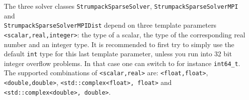 \documentclass{article}
\begin{document}
The three solver classes \lstinline[style=C]!StrumpackSparseSolver!,
\lstinline[style=C]!StrumpackSparseSolverMPI! and\\
\lstinline[style=C]!StrumpackSparseSolverMPIDist! depend on three
template parameters \lstinline[style=C]!<scalar,real,integer>!: the
type of a scalar, the type of the corresponding real number and an
integer type. It is recommended to first try to simply use the default
\lstinline[style=C]!int! type for this last template parameter, unless
you run into 32 bit integer overflow problems. In that case one can
switch to for instance \lstinline[style=C]!int64_t!. The supported
combinations of \lstinline[style=C]!<scalar,real>! are:
\lstinline[style=C]!<float,float>!,
\lstinline[style=C]!<double,double>!,
\lstinline[style=C]!<std::complex<float>, float>! and
\lstinline[style=C]!<std::complex<double>, double>!.
\end{document}
